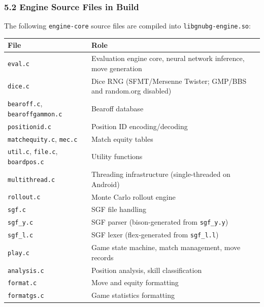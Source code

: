 \documentclass[11pt,a4paper]{article}
\begin{document}
\subsubsection{5.2 Engine Source Files in
Build}\label{engine-source-files-in-build}

The following \texttt{engine-core} source files are compiled into
\texttt{libgnubg-engine.so}:

\begin{longtable}[]{@{}
  >{\raggedright\arraybackslash}p{}
  >{\raggedright\arraybackslash}p{}@{}}
\toprule\noalign{}
\begin{minipage}[b]{\linewidth}\raggedright
File
\end{minipage} & \begin{minipage}[b]{\linewidth}\raggedright
Role
\end{minipage} \\
\midrule\noalign{}
\endhead
\bottomrule\noalign{}
\endlastfoot
\texttt{eval.c} & Evaluation engine core, neural network inference, move
generation \\
\texttt{dice.c} & Dice RNG (SFMT/Mersenne Twister; GMP/BBS and
random.org disabled) \\
\texttt{bearoff.c}, \texttt{bearoffgammon.c} & Bearoff database \\
\texttt{positionid.c} & Position ID encoding/decoding \\
\texttt{matchequity.c}, \texttt{mec.c} & Match equity tables \\
\texttt{util.c}, \texttt{file.c}, \texttt{boardpos.c} & Utility
functions \\
\texttt{multithread.c} & Threading infrastructure (single-threaded on
Android) \\
\texttt{rollout.c} & Monte Carlo rollout engine \\
\texttt{sgf.c} & SGF file handling \\
\texttt{sgf\_y.c} & SGF parser (bison-generated from
\texttt{sgf\_y.y}) \\
\texttt{sgf\_l.c} & SGF lexer (flex-generated from \texttt{sgf\_l.l}) \\
\texttt{play.c} & Game state machine, match management, move records \\
\texttt{analysis.c} & Position analysis, skill classification \\
\texttt{format.c} & Move and equity formatting \\
\texttt{formatgs.c} & Game statistics formatting \\

\end{longtable}
\end{document}
